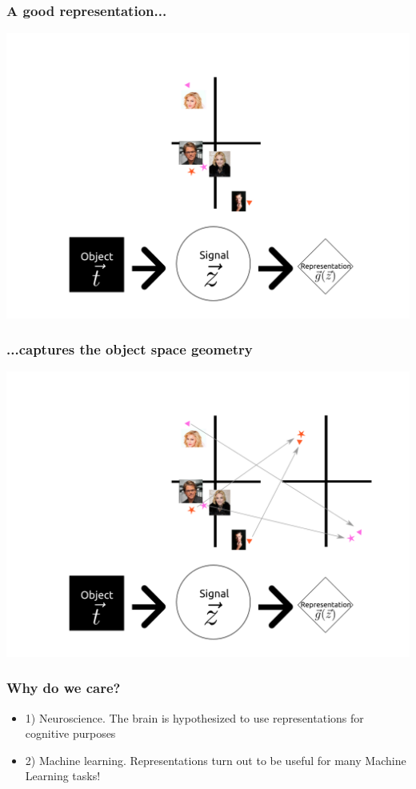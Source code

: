 \documentclass{beamer}
\begin{document}
\begin{frame}
\frametitle{A good representation...}
\begin{center}
\includegraphics[scale = 0.4]{defense_diagrams/geometry2.png}
\end{center}
\end{frame}

\begin{frame}
\frametitle{...captures the object space geometry}
\begin{center}
\includegraphics[scale = 0.4]{defense_diagrams/geometry2a.png}
\end{center}
\end{frame}



\begin{frame}
\frametitle{Why do we care?}
\begin{itemize}
\item 1) Neuroscience.  The brain is hypothesized to use representations for cognitive purposes \pause
\item 2) Machine learning.  Representations turn out to be useful for many Machine Learning tasks!
\end{itemize}
\end{frame}
\end{document}
